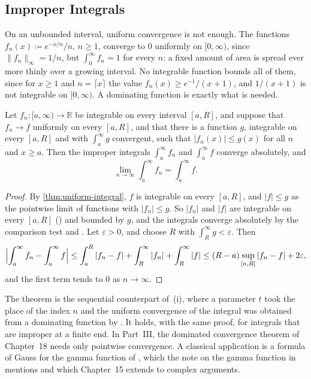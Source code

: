 \subsection{Improper Integrals}

On an unbounded interval, uniform convergence is not enough. The functions $f_n(x)\coloneqq e^{-x/n}/n$, $n\ge1$, converge to $0$ uniformly on $[0,\infty)$, since $\|f_n\|_\infty=1/n$, but $\int_0^\infty f_n=1$ for every $n$: a fixed amount of area is spread ever more thinly over a growing interval. No integrable function bounds all of them, since for $x\ge1$ and $n=\lceil x\rceil$ the value $f_n(x)\ge e^{-1}/(x+1)$, and $1/(x+1)$ is not integrable on $[0,\infty)$. A dominating function is exactly what is needed.

\begin{theorem}
\label{thm:improper-dominated}
Let $f_n\colon[a,\infty)\to\mathbb R$ be integrable on every interval $[a,R]$, and suppose that $f_n\to f$ uniformly on every $[a,R]$, and that there is a function $g$, integrable on every $[a,R]$ and with $\int_a^\infty g$ convergent, such that $|f_n(x)|\le g(x)$ for all $n$ and $x\ge a$. Then the improper integrals $\int_a^\infty f_n$ and $\int_a^\infty f$ converge absolutely, and
\[
\lim_{n\to\infty}\int_a^\infty f_n=\int_a^\infty f .
\]
\end{theorem}

\begin{proof}
By \cref{thm:uniform-integral}, $f$ is integrable on every $[a,R]$, and $|f|\le g$ as the pointwise limit of functions with $|f_n|\le g$. So $|f_n|$ and $|f|$ are integrable on every $[a,R]$ () and bounded by $g$, and the integrals converge absolutely by the comparison test and . Let $\varepsilon>0$, and choose $R$ with $\int_R^\infty g<\varepsilon$. Then
\[
\Bigl|\int_a^\infty f_n-\int_a^\infty f\Bigr|\le\int_a^R|f_n-f|+\int_R^\infty|f_n|+\int_R^\infty|f|\le(R-a)\sup_{[a,R]}|f_n-f|+2\varepsilon ,
\]
and the first term tends to $0$ as $n\to\infty$.
\end{proof}

The theorem is the sequential counterpart of \,(i), where a parameter $t$ took the place of the index $n$ and the uniform convergence of the integral was obtained from a dominating function by . It holds, with the same proof, for integrals that are improper at a finite end. In Part~III, the dominated convergence theorem of Chapter~18 needs only pointwise convergence. A classical application is a formula of Gauss for the gamma function of , which the note on the gamma function in  mentions and which Chapter~15 extends to complex arguments.

